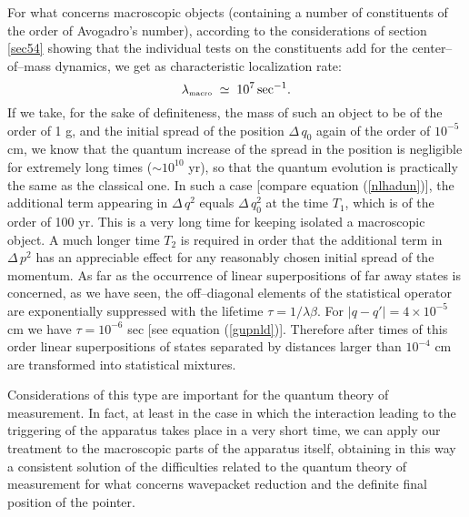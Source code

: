 \documentclass[10pt,a4paper]{article}
\begin{document}
For what concerns macroscopic objects (containing a number of
constituents of the order of Avogadro's number), according to the
considerations of section \ref{sec54} showing that the individual
tests on the constituents add for the center--of--mass dynamics,
we get as characteristic localization rate:
\begin{equation}
\lambda_{\makebox{\tiny macro}} \; \simeq \; 10^{7}\,
\makebox{sec}^{-1}.
\end{equation}
If we take, for the sake of definiteness, the mass of such an
object to be of the order of 1 g, and the initial spread of the
position $\Delta\,q_{0}$ again of the order of $10^{-5}$ cm, we
know that the quantum increase of the spread in the position is
negligible for extremely long times ($\sim 10^{10}$ yr), so that
the quantum evolution is practically the same as the classical
one. In such a case [compare equation (\ref{nlhadun})], the
additional term appearing in $\Delta\, q^{2}$ equals $\Delta\,
q_{0}^{2}$ at the time $T_{1}$, which is of the order of 100 yr.
This is a very long time for keeping isolated a macroscopic
object. A much longer time $T_{2}$ is required in order that the
additional term in $\Delta\, p^{2}$ has an appreciable effect for
any reasonably chosen initial spread of the momentum. As far as
the occurrence of linear superpositions of far away states is
concerned, as we have seen, the off--diagonal elements of the
statistical operator are exponentially suppressed with the
lifetime $\tau = 1/\lambda\beta$. For $|q - q'| = 4\times 10^{-5}$
cm we have $\tau = 10^{-6}$ sec [see equation (\ref{gupnld})].
Therefore after times of this order linear superpositions of
states separated by distances larger than $10^{-4}$ cm are
transformed into statistical mixtures.

Considerations of this type are important for the quantum theory
of measurement. In fact, at least in the case in which the
interaction leading to the triggering of the apparatus takes place
in a very short time, we can apply our treatment to the
macroscopic parts of the apparatus itself, obtaining in this way a
consistent solution of the difficulties related to the quantum
theory of measurement for what concerns wavepacket reduction and
the definite final position of the pointer.
\end{document}
